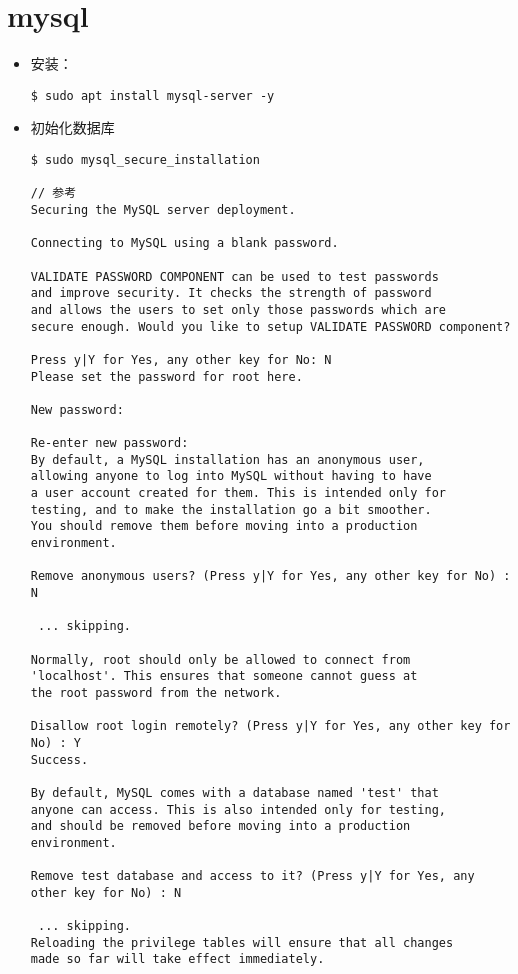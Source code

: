 \section{mysql}

\begin{itemize}
\item 安装：
\begin{lstlisting}
$ sudo apt install mysql-server -y
\end{lstlisting}

\item 初始化数据库
\begin{lstlisting}
$ sudo mysql_secure_installation

// 参考
Securing the MySQL server deployment.

Connecting to MySQL using a blank password.

VALIDATE PASSWORD COMPONENT can be used to test passwords
and improve security. It checks the strength of password
and allows the users to set only those passwords which are
secure enough. Would you like to setup VALIDATE PASSWORD component?

Press y|Y for Yes, any other key for No: N
Please set the password for root here.

New password: 

Re-enter new password: 
By default, a MySQL installation has an anonymous user,
allowing anyone to log into MySQL without having to have
a user account created for them. This is intended only for
testing, and to make the installation go a bit smoother.
You should remove them before moving into a production
environment.

Remove anonymous users? (Press y|Y for Yes, any other key for No) : N

 ... skipping.

Normally, root should only be allowed to connect from
'localhost'. This ensures that someone cannot guess at
the root password from the network.

Disallow root login remotely? (Press y|Y for Yes, any other key for No) : Y
Success.

By default, MySQL comes with a database named 'test' that
anyone can access. This is also intended only for testing,
and should be removed before moving into a production
environment.

Remove test database and access to it? (Press y|Y for Yes, any other key for No) : N

 ... skipping.
Reloading the privilege tables will ensure that all changes
made so far will take effect immediately.


\end{lstlisting}
\end{itemize}
